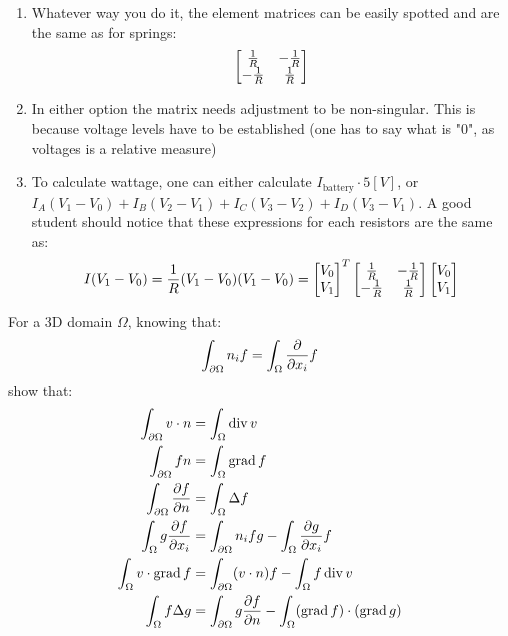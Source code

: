 \documentclass[12pt,class=article,crop=false,preview=false]{standalone}
\begin{document}
\begin{solution}
\begin{enumerate}[label=\alph*)]
    \item Whatever way you do it, the element matrices can be easily spotted and are the same as for springs:
\[\left[\begin{matrix}\frac{1}{R} & -\frac{1}{R} \\ -\frac{1}{R} & \frac{1}{R}\end{matrix}\right]\]
    \item In either option the matrix needs adjustment to be non-singular. This is because voltage levels have to be established (one has to say what is "0", as voltages is a relative measure)
    \item To calculate wattage, one can either calculate $I_\text{battery}\cdot 5[V]$, or $I_A(V_1-V_0)+I_B(V_2-V_1)+I_C(V_3-V_2)+I_D(V_3-V_1)$. A good student should notice that these expressions for each resistors are the same as:
    \[I(V_1-V_0) = \frac{1}{R}(V_1-V_0)(V_1-V_0) = \left[\begin{matrix}V_0\\V_1\end{matrix}\right]^T\left[\begin{matrix}\frac{1}{R} & -\frac{1}{R} \\ -\frac{1}{R} & \frac{1}{R}\end{matrix}\right]\left[\begin{matrix}V_0\\V_1\end{matrix}\right]\]
\end{enumerate}
\end{solution}

\begin{exercise}
For a 3D domain $\Omega$, knowing that:
\[\int_{\partial\Omega} n_i f = \int_\Omega\frac{\partial}{\partial x_i} f\]
show that:
\begin{align}
\int_{\partial\Omega} v\cdot n &= \int_\Omega\operatorname{div}{v}\\ 
\int_{\partial\Omega} f n &= \int_\Omega\operatorname{grad}{f}\\
\int_{\partial\Omega} \frac{\partial f}{\partial n} &= \int_\Omega\Delta f\\
\int_\Omega g\frac{\partial f}{\partial x_i} &= \int_{\partial\Omega} n_i fg - \int_\Omega \frac{\partial g}{\partial x_i}f\\
\int_\Omega v\cdot\operatorname{grad}{f} &= \int_{\partial\Omega} (v\cdot n)f - \int_\Omega f\operatorname{div}{v}\\
\int_\Omega f\Delta{g} &= \int_{\partial\Omega} g\frac{\partial f}{\partial n} - \int_\Omega (\operatorname{grad}{f})\cdot(\operatorname{grad}{g})
\end{align}
\end{exercise}
\end{document}
